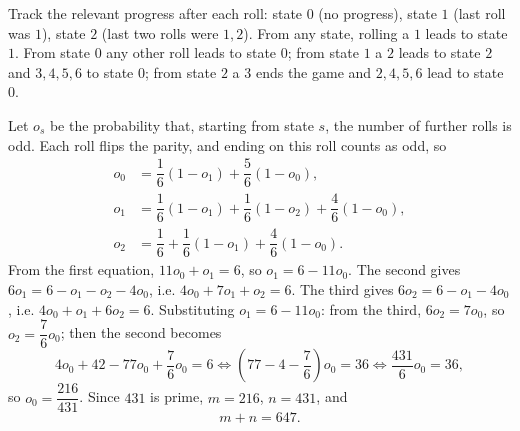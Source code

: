 Track the relevant progress after each roll: state \(0\) (no progress), state \(1\) (last roll was \(1\)), state \(2\) (last two rolls were \(1,2\)). From any state, rolling a \(1\) leads to state \(1\). From state \(0\) any other roll leads to state \(0\); from state \(1\) a \(2\) leads to state \(2\) and \(3,4,5,6\) to state \(0\); from state \(2\) a \(3\) ends the game and \(2,4,5,6\) lead to state \(0\).

Let \(o_s\) be the probability that, starting from state \(s\), the number of further rolls is odd. Each roll flips the parity, and ending on this roll counts as odd, so
\[
\begin{aligned}
o_0&=\dfrac{1}{6}(1-o_1)+\dfrac{5}{6}(1-o_0),\\
o_1&=\dfrac{1}{6}(1-o_1)+\dfrac{1}{6}(1-o_2)+\dfrac{4}{6}(1-o_0),\\
o_2&=\dfrac{1}{6}+\dfrac{1}{6}(1-o_1)+\dfrac{4}{6}(1-o_0).
\end{aligned}
\]
From the first equation, \(11o_0+o_1=6\), so \(o_1=6-11o_0\). The second gives \(6o_1=6-o_1-o_2-4o_0\), i.e. \(4o_0+7o_1+o_2=6\). The third gives \(6o_2=6-o_1-4o_0\), i.e. \(4o_0+o_1+6o_2=6\). Substituting \(o_1=6-11o_0\): from the third, \(6o_2=7o_0\), so \(o_2=\dfrac{7}{6}o_0\); then the second becomes
\[
4o_0+42-77o_0+\dfrac{7}{6}o_0=6\iff\left(77-4-\dfrac{7}{6}\right)o_0=36\iff\dfrac{431}{6}o_0=36,
\]
so \(o_0=\dfrac{216}{431}\). Since \(431\) is prime, \(m=216\), \(n=431\), and
\[
m+n=\boxed{647}.
\]
